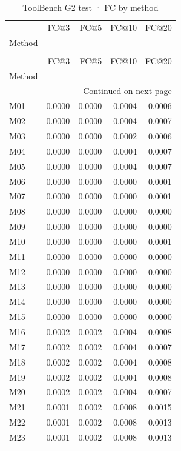 \begin{longtable}{lrrrr}
\caption{ToolBench G2 test · FC by method} \label{tab:ToolBench-G2-test-family-family-fullcoverage} \\
\toprule
 & FC@3 & FC@5 & FC@10 & FC@20 \\
Method &  &  &  &  \\
\midrule
\endfirsthead
\caption[]{ToolBench G2 test · FC by method} \\
\toprule
 & FC@3 & FC@5 & FC@10 & FC@20 \\
Method &  &  &  &  \\
\midrule
\endhead
\midrule
\multicolumn{5}{r}{Continued on next page} \\
\midrule
\endfoot
\bottomrule
\endlastfoot
M01 & 0.0000 & 0.0000 & 0.0004 & 0.0006 \\
M02 & 0.0000 & 0.0000 & 0.0004 & 0.0007 \\
M03 & 0.0000 & 0.0000 & 0.0002 & 0.0006 \\
M04 & 0.0000 & 0.0000 & 0.0004 & 0.0007 \\
M05 & 0.0000 & 0.0000 & 0.0004 & 0.0007 \\
M06 & 0.0000 & 0.0000 & 0.0000 & 0.0001 \\
M07 & 0.0000 & 0.0000 & 0.0000 & 0.0001 \\
M08 & 0.0000 & 0.0000 & 0.0000 & 0.0000 \\
M09 & 0.0000 & 0.0000 & 0.0000 & 0.0000 \\
M10 & 0.0000 & 0.0000 & 0.0000 & 0.0001 \\
M11 & 0.0000 & 0.0000 & 0.0000 & 0.0000 \\
M12 & 0.0000 & 0.0000 & 0.0000 & 0.0000 \\
M13 & 0.0000 & 0.0000 & 0.0000 & 0.0000 \\
M14 & 0.0000 & 0.0000 & 0.0000 & 0.0000 \\
M15 & 0.0000 & 0.0000 & 0.0000 & 0.0000 \\
M16 & 0.0002 & 0.0002 & 0.0004 & 0.0008 \\
M17 & 0.0002 & 0.0002 & 0.0004 & 0.0007 \\
M18 & 0.0002 & 0.0002 & 0.0004 & 0.0008 \\
M19 & 0.0002 & 0.0002 & 0.0004 & 0.0008 \\
M20 & 0.0002 & 0.0002 & 0.0004 & 0.0007 \\
M21 & 0.0001 & 0.0002 & 0.0008 & 0.0015 \\
M22 & 0.0001 & 0.0002 & 0.0008 & 0.0013 \\
M23 & 0.0001 & 0.0002 & 0.0008 & 0.0013 \\

\end{longtable}
